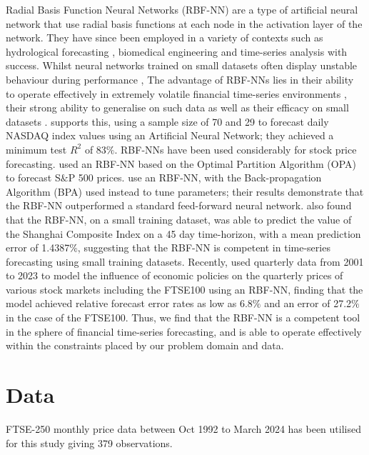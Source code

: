 \documentclass[11pt,a4paper]{article}
\newcommand{\citeboth}[1]{\citeauthor{#1} \citep{#1}}
\begin{document}
Radial Basis Function Neural Networks (RBF-NN) are a type of artificial 
neural network that use radial basis functions at each node in the 
activation layer of the network. They have since been employed in a variety of contexts such as 
hydrological forecasting \citep{chang2001}, biomedical engineering 
\citep{ibrikci2002} and time-series analysis \citep{xiong2015} with success. 
Whilst neural networks trained on small datasets often display unstable 
behaviour during performance \citep{lebaron1998}, The advantage of 
RBF-NNs lies in their ability to 
operate effectively in extremely volatile financial time-series 
environments \citep{cafferata2019}, their strong ability to 
generalise on such data \citep{sharkawy2020} as well as their efficacy on small datasets \citep{kosarac2022}. 
\citeboth{esfandyari2016}
supports this, using a sample size of 70 and 29 to forecast daily NASDAQ 
index values using an Artificial Neural Network; they achieved a minimum
test $R^2$ of 83$\%$. RBF-NNs have been used 
considerably for stock price forecasting. \citeboth{cao2004} 
used an RBF-NN based on the Optimal Partition Algorithm (OPA) to 
forecast S$\&$P 500 prices. \citeboth{dass2019} use an RBF-NN, with the Back-propagation 
Algorithm (BPA) used instead to tune parameters; their results demonstrate 
that the RBF-NN outperformed a standard feed-forward neural network. 
\citeboth{ji2014} also found that the RBF-NN, on a 
small training dataset, was able to predict the value 
of the Shanghai Composite Index on a 45 day time-horizon, with a mean prediction error of 
1.4387$\%$, suggesting that the RBF-NN is competent in time-series 
forecasting using small training datasets. Recently, \citeboth{abotaleb2024}
used quarterly data from 2001 to 2023 to model the influence of economic 
policies on the quarterly prices of various stock markets including the 
FTSE100 using an RBF-NN, finding that the model 
achieved relative forecast error rates as low as 6.8$\%$ and an error of 
27.2$\%$ in the case of the FTSE100. Thus, we find that the RBF-NN is a 
competent tool in the sphere of financial time-series forecasting, and 
is able to operate effectively within the constraints placed by our 
problem domain and data.

\section{Data}

FTSE-250 monthly price data between Oct 1992 to March 2024 has been utilised for this study giving 379 observations.
\end{document}
